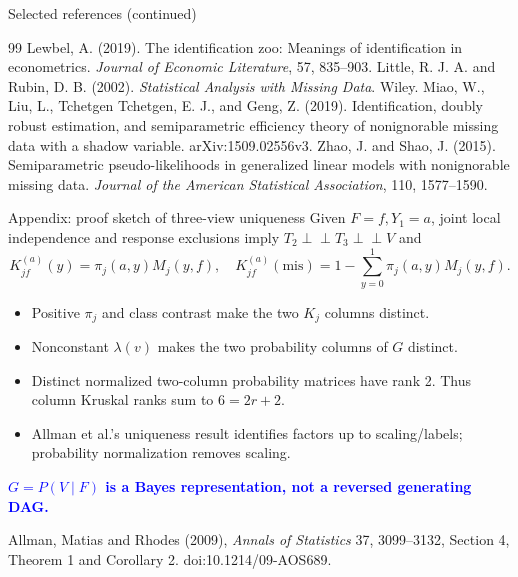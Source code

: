 \documentclass[aspectratio=169,10pt]{beamer}
\newcommand{\slideannotation}{\fontsize{8pt}{9.6pt}\selectfont}
\newcommand{\indep}{\mathrel{\perp\!\!\!\perp}}
\newcommand{\bluekey}[1]{\textcolor{Blue}{\textbf{#1}}}
\begin{document}
\begin{frame}{Selected references (continued)}
\begin{thebibliography}{99}
 Lewbel, A. (2019). The identification zoo: Meanings of identification in econometrics. \emph{Journal of Economic Literature}, 57, 835--903.
 Little, R. J. A. and Rubin, D. B. (2002). \emph{Statistical Analysis with Missing Data}. Wiley.
 Miao, W., Liu, L., Tchetgen Tchetgen, E. J., and Geng, Z. (2019). Identification, doubly robust estimation, and semiparametric efficiency theory of nonignorable missing data with a shadow variable. arXiv:1509.02556v3.
 Zhao, J. and Shao, J. (2015). Semiparametric pseudo-likelihoods in generalized linear models with nonignorable missing data. \emph{Journal of the American Statistical Association}, 110, 1577--1590.
\end{thebibliography}
\end{frame}

\appendix
\begin{frame}{Appendix: proof sketch of three-view uniqueness}
Given $F=f,Y_1=a$, joint local independence and response exclusions imply
$T_2\indep T_3\indep V$ and
\[
K_{jf}^{(a)}(y)=\pi_j(a,y)M_j(y,f),\quad
K_{jf}^{(a)}(\mathrm{mis})=1-\sum_{y=0}^1\pi_j(a,y)M_j(y,f).
\]
\begin{itemize}
\setlength{\itemsep}{.5em}
\item Positive $\pi_j$ and class contrast make the two $K_j$ columns distinct.
\item Nonconstant $\lambda(v)$ makes the two probability columns of $G$ distinct.
\item Distinct normalized two-column probability matrices have rank 2.
Thus column Kruskal ranks sum to $6=2r+2$.
\item Allman et al.'s uniqueness result identifies factors up to scaling/labels;
probability normalization removes scaling.
\end{itemize}
\bluekey{$G=P(V\mid F)$ is a Bayes representation, not a reversed generating DAG.}
\par\smallskip
{\slideannotation Allman, Matias and Rhodes (2009), \emph{Annals of Statistics} 37, 3099--3132, Section 4, Theorem 1 and Corollary 2. doi:10.1214/09-AOS689.}
\end{frame}
\end{document}
